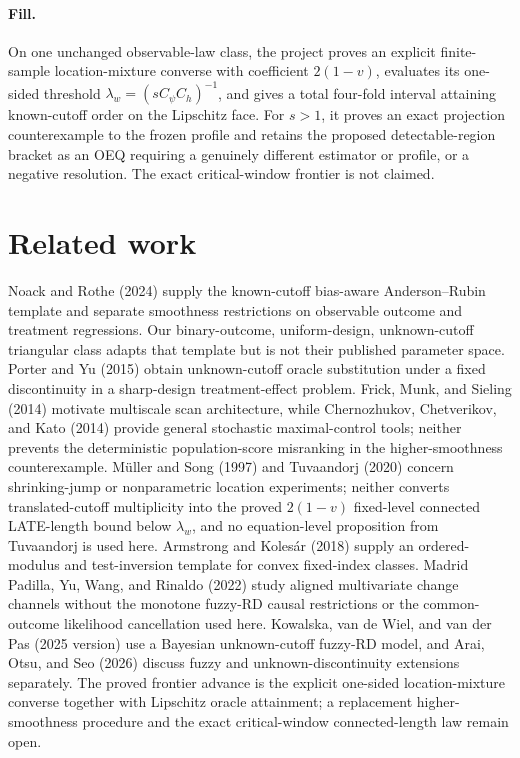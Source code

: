 \documentclass{article}
\begin{document}
\paragraph{Fill.} On one unchanged observable-law class, the project proves an explicit finite-sample location-mixture converse with coefficient \(2(1-v)\), evaluates its one-sided threshold \(\lambda_w=(sC_\psi C_h)^{-1}\), and gives a total four-fold interval attaining known-cutoff order on the Lipschitz face.  For \(s>1\), it proves an exact projection counterexample to the frozen profile and retains the proposed detectable-region bracket as an OEQ requiring a genuinely different estimator or profile, or a negative resolution.  The exact critical-window frontier is not claimed.

\section{Related work}

Noack and Rothe (2024) supply the known-cutoff bias-aware Anderson--Rubin template and separate smoothness restrictions on observable outcome and treatment regressions. Our binary-outcome, uniform-design, unknown-cutoff triangular class adapts that template but is not their published parameter space.  Porter and Yu (2015) obtain unknown-cutoff oracle substitution under a fixed discontinuity in a sharp-design treatment-effect problem.  Frick, Munk, and Sieling (2014) motivate multiscale scan architecture, while Chernozhukov, Chetverikov, and Kato (2014) provide general stochastic maximal-control tools; neither prevents the deterministic population-score misranking in the higher-smoothness counterexample.  M{\"u}ller and Song (1997) and Tuvaandorj (2020) concern shrinking-jump or nonparametric location experiments; neither converts translated-cutoff multiplicity into the proved \(2(1-v)\) fixed-level connected LATE-length bound below \(\lambda_w\), and no equation-level proposition from Tuvaandorj is used here.  Armstrong and Koles{\'a}r (2018) supply an ordered-modulus and test-inversion template for convex fixed-index classes.  Madrid Padilla, Yu, Wang, and Rinaldo (2022) study aligned multivariate change channels without the monotone fuzzy-RD causal restrictions or the common-outcome likelihood cancellation used here.  Kowalska, van de Wiel, and van der Pas (2025 version) use a Bayesian unknown-cutoff fuzzy-RD model, and Arai, Otsu, and Seo (2026) discuss fuzzy and unknown-discontinuity extensions separately.  The proved frontier advance is the explicit one-sided location-mixture converse together with Lipschitz oracle attainment; a replacement higher-smoothness procedure and the exact critical-window connected-length law remain open.
\end{document}
